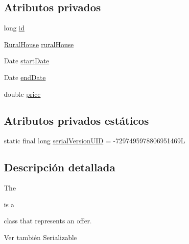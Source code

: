 \subsection*{Atributos privados}
\begin{DoxyCompactItemize}
\item 
long \mbox{\hyperlink{classcom_1_1ruralhousejsf_1_1domain_1_1_offer_aba6516f5b9bb2dbe5d8b99404335adfc}{id}}
\item 
\mbox{\hyperlink{classcom_1_1ruralhousejsf_1_1domain_1_1_rural_house}{Rural\+House}} \mbox{\hyperlink{classcom_1_1ruralhousejsf_1_1domain_1_1_offer_a87036858904c59c964d2c75137a97323}{rural\+House}}
\item 
Date \mbox{\hyperlink{classcom_1_1ruralhousejsf_1_1domain_1_1_offer_a3c4e8f6eb72413f6f76b1e4b05404ea8}{start\+Date}}
\item 
Date \mbox{\hyperlink{classcom_1_1ruralhousejsf_1_1domain_1_1_offer_a315f9b97f02da79a97fa489db212b5ce}{end\+Date}}
\item 
double \mbox{\hyperlink{classcom_1_1ruralhousejsf_1_1domain_1_1_offer_a2106c38f0c490e3263b1364c3ac56b0a}{price}}
\end{DoxyCompactItemize}
\subsection*{Atributos privados estáticos}
\begin{DoxyCompactItemize}
\item 
static final long \mbox{\hyperlink{classcom_1_1ruralhousejsf_1_1domain_1_1_offer_a4516c2ff68502d92f1405b8478e9fe6f}{serial\+Version\+U\+ID}} = -\/7297495978806951469L
\end{DoxyCompactItemize}


\subsection{Descripción detallada}
The
\begin{DoxyCode}{0}
\end{DoxyCode}
 is a
\begin{DoxyCode}{0}
\end{DoxyCode}
 class that represents an offer.

\begin{DoxySeeAlso}{Ver también}
Serializable 
\end{DoxySeeAlso}


